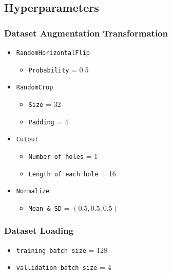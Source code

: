 \documentclass[12pt]{article}
\begin{document}
\newpage
\subsection{Hyperparameters}
\vspace{-0.3cm}


\begin{multicols}{2}
\subsubsection*{Dataset Augmentation Transformation}

\begin{itemize}
  \item \texttt{RandomHorizontalFlip}
    \begin{itemize}
      \item \texttt{Probability} = 0.5
    \end{itemize}
  \item \texttt{RandomCrop}
    \begin{itemize}
      \item \texttt{Size} = 32
      \item \texttt{Padding} = 4
    \end{itemize}
  \item \texttt{Cutout}
    \begin{itemize}
      \item \texttt{Number of holes} = 1
      \item \texttt{Length of each hole} = 16
    \end{itemize}
  \item \texttt{Normalize}
    \begin{itemize}
      \item \texttt{Mean \& SD} = $(0.5, 0.5, 0.5)$
    \end{itemize}
\end{itemize}

\subsubsection*{Dataset Loading}
\begin{itemize}
    \item \texttt{training batch size} = 128
    \item \texttt{vallidation batch size} = 4
\end{itemize}


\end{multicols}
\end{document}
